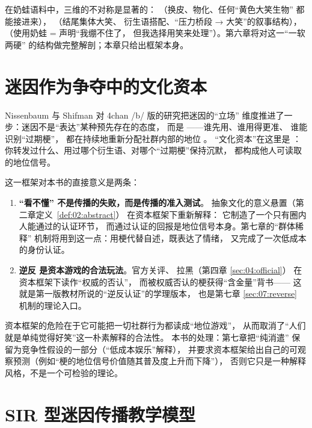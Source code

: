 在奶蛙语料中，三维的不对称是显著的：
  （换皮、物化、任何“黄色大笑生物”
 都能接进来），  （结尾集体大笑、
 衍生语搭配、“压力桥段 → 大笑”的叙事结构），
  （使用奶蛙 = 声明“我绷不住了，
 但我选择用笑来处理”）。第六章将对这一“一软两硬”
 的结构做完整解剖；本章只给出框架本身。

\section{迷因作为争夺中的文化资本}\label{sec:05:capital}

Nissenbaum 与 Shifman 对 4chan /b/ 版的研究把迷因的“立场”
维度推进了一步：迷因不是“表达”某种预先存在的态度，
 而是 ——谁先用、谁用得更准、
 谁能识别“过期梗”，
 都在持续地重新分配社群内部的地位 \cite{nissenbaum2015contested}。
 “文化资本”在这里是 ：
 你转发过什么、用过哪个衍生语、对哪个“过期梗”保持沉默，
 都构成他人可读取的地位信号。

这一框架对本书的直接意义是两条：

\begin{enumerate}[label=\arabic*.]
  \item \textbf{“看不懂”
不是传播的失败，而是传播的准入测试}。
 抽象文化的意义悬置（第二章定义~\ref{def:02:abstract}）
 在资本框架下重新解释：
 它制造了一个只有圈内人能通过的认证环节，
 而通过认证的回报是地位信号本身。第七章的“群体稀释”
 机制将用到这一点：用梗代替自述，既表达了情绪，
 又完成了一次低成本的身份认证。
  \item \textbf{逆反
是资本游戏的合法玩法}。官方关评、
 拉黑（第四章 \ref{sec:04:official}）
 在资本框架下读作“权威的否认”，
 而被权威否认的梗获得“含金量”背书——
 这就是第一版教材所说的“逆反认证”的学理版本，
 也是第七章 \ref{sec:07:reverse} 机制的理论入口。
\end{enumerate}

\begin{nlcritique}[批判性反思]
资本框架的危险在于它可能把一切社群行为都读成“地位游戏”，
 从而取消了“人们就是单纯觉得好笑”这一朴素解释的合法性。
 本书的处理：第七章把“纯消遣”
 保留为竞争性假设的一部分（“低成本娱乐”解释），
 并要求资本框架给出自己的可观察预测（例如“梗的地位信号价值随其普及度上升而下降”），
 否则它只是一种解释风格，不是一个可检验的理论。
\end{nlcritique}

\section{SIR 型迷因传播教学模型}\label{sec:05:sir}

